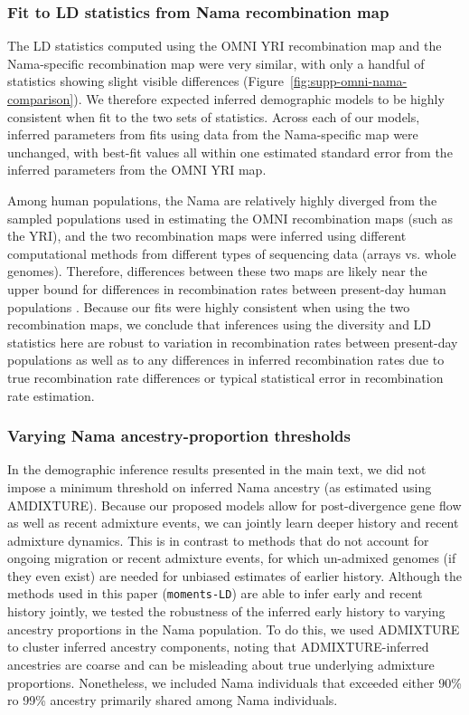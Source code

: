 \documentclass[]{article}
\begin{document}
\subsubsection{Fit to LD statistics from Nama recombination map}

The LD statistics computed using the OMNI YRI recombination map and the
Nama-specific recombination map were very similar, with only a handful of
statistics showing slight visible differences
(Figure~\ref{fig:supp-omni-nama-comparison}). We therefore expected inferred
demographic models to be highly consistent when fit to the two sets of
statistics. Across each of our models, inferred parameters from fits using data
from the Nama-specific map were unchanged, with best-fit values all within one
estimated standard error from the inferred parameters from the OMNI YRI map.

Among human populations, the Nama are relatively highly diverged from the
sampled populations used in estimating the OMNI recombination maps (such as the
YRI), and the two recombination maps were inferred using different
computational methods from different types of sequencing data (arrays vs. whole
genomes). Therefore, differences between these two maps are likely near the
upper bound for differences in recombination rates between present-day human
populations \citep{Van_Eeden2021-od}. Because our fits were highly consistent
when using the two recombination maps, we conclude that inferences using the
diversity and LD statistics here are robust to variation in recombination rates
between present-day populations as well as to any differences in inferred
recombination rates due to true recombination rate differences or typical
statistical error in recombination rate estimation.

\subsubsection{Varying Nama ancestry-proportion thresholds}

In the demographic inference results presented in the main text, we did not
impose a minimum threshold on inferred Nama ancestry (as estimated using
AMDIXTURE). Because our proposed models allow for post-divergence gene flow as
well as recent admixture events, we can jointly learn deeper history and recent
admixture dynamics. This is in contrast to methods that do not account for
ongoing migration or recent admixture events, for which un-admixed genomes (if
they even exist) are needed for unbiased estimates of earlier history.
Although the methods used in this paper (\texttt{moments-LD}) are able to infer
early and recent history jointly, we tested the robustness of the inferred
early history to varying ancestry proportions in the Nama population. To do
this, we used ADMIXTURE to cluster inferred ancestry components, noting that
ADMIXTURE-inferred ancestries are coarse and can be misleading about true
underlying admixture proportions. Nonetheless, we included Nama individuals
that exceeded either 90\% ro 99\% ancestry primarily shared among Nama
individuals.
\end{document}
